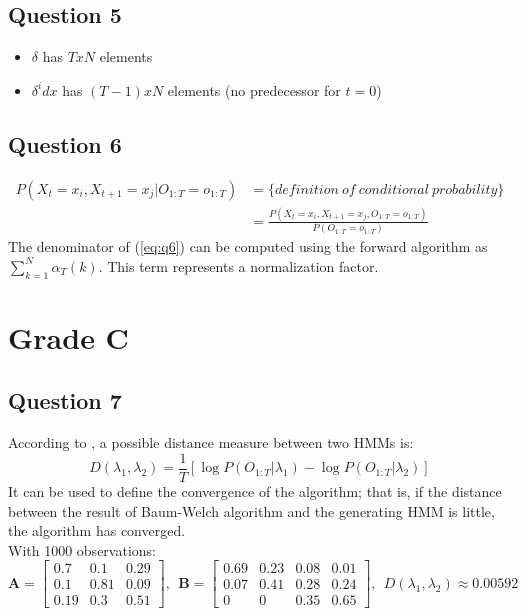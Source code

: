 \documentclass{scrartcl}
\begin{document}
\subsection{Question 5}

\begin{itemize}
 \item $\delta$ has $TxN$ elements
 \item $\delta^idx$ has $(T-1)xN$ elements (no predecessor for $t=0$)
\end{itemize}

\subsection{Question 6}

\begin{align} \label{eq:q6}
 P(X_t=x_i, X_{t+1}=x_j | O_{1:T}=o_{1:T}) &= \{definition\ of\ conditional\ probability\} \nonumber \\
 &= \frac{P(X_t=x_i, X_{t+1}=x_j, O_{1:T}=o_{1:T})}{P(O_{1:T}=o_{1:T})}
\end{align}
The denominator of (\ref{eq:q6}) can be computed using the forward algorithm as $\sum_{k=1}^N \alpha_T(k)$. This term represents a normalization factor.


\section{Grade C}

\subsection{Question 7}

According to \cite{rabiner1989tutorial}, a possible distance measure between two HMMs is:
\begin{equation}
 D(\lambda_1, \lambda_2) = \frac{1}{T} \left[ \log P(O_{1:T}|\lambda_1) - \log P(O_{1:T}|\lambda_2) \right]
\end{equation}
It can be used to define the convergence of the algorithm; that is, if the distance between the result of Baum-Welch algorithm and the generating HMM is little, the algorithm has converged. \\

With 1000 observations:
\begin{equation}
 \mathbf{A} = 
 \begin{bmatrix}
  0.7 & 0.1 & 0.29 \\
  0.1 & 0.81 & 0.09 \\
  0.19 & 0.3 & 0.51
 \end{bmatrix} 
 ,\ \ \mathbf{B} = 
 \begin{bmatrix}
  0.69 & 0.23 & 0.08 & 0.01 \\
  0.07 & 0.41 & 0.28 & 0.24 \\
  0 & 0 & 0.35 & 0.65
 \end{bmatrix}
 ,\ \ D(\lambda_1, \lambda_2) \approx 0.00592
\end{equation}
\end{document}
